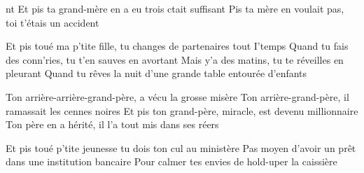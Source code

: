 nt
Et pis ta grand-mère en a eu trois ctait suffisant
Pis ta mère en voulait pas, toi t'étais un accident
\endverse

\beginverse
Et pis toué ma p'tite fille, tu changes de partenaires tout I'temps
Quand tu fais des conn'ries, tu t'en sauves en avortant
Mais y'a des matins, tu te réveilles en pleurant
Quand tu rêves la nuit d'une grande table entourée d'enfants
\endverse

\beginverse
Ton arrière-arrière-grand-père, a vécu la grosse misère
Ton arrière-grand-père, il ramassait les cennes noires
Et pis ton grand-père, miracle, est devenu millionnaire
Ton père en a hérité, il l'a tout mis dans ses réers
\endverse

\beginverse
Et pis toué p'tite jeunesse tu dois ton cul au ministère
Pas moyen d'avoir un prêt dans une institution bancaire
Pour calmer tes envies de hold-uper la caissière
\]\]\]\]\]\]\]\]\]\]\]\]\]\]\]\]\]\]\]\]\]\]\]\]\]\]\]\]\]\]\]\]\]\]\]\]\]\]\]\]\]\]\]\]\]\]\]\]\]\]\]\]\]\]\]\]\]\]\]\]\]\]\]\]\]\]\]\]\]\]\]\]\]\]\]\]\]\]\]\]\]\]\]\]\]\]\]\]\]\]\]\]\]\]\]\]\]\]\]\]\]\]\]\]\]\]\]\]\]\]\]\]\]\]\]\]\]\]\]\]\]\]\]\]\]\]\]\]\]\]\]\]\]\]\]\]\]\]\]\]\]\]\]\]\]\]\]\]\]\]\]\]\]\]\]\]\]\]\]\]\]\]\]\]\]\]\]\]\]\]\]\]\]\]\]\]\]\]\]\]\]\]\]\]\]\]\]\]\]\]\]\]\]\]\]\]\]\]\]\]\]\]\]\]\]\]\]\]\]\]\]\]\]\]\]\]\]\]\]\]\]\]\]\]\]\]\]\]\]\]\]\]\]\]\]\]\]\]\]\]\]\]\]\]\]\]\]\]\]\]\]\]\]\]\]\]\]\]\]\]\]\]\]\]\]\]\]\]\]\]\]\]\]\]\]\]\]\]\]\]\]\]\]\]\]\]\]\]\]\]\]\]\]\]\]\]\]\]\]\]\]\]\]\]\]\]\]\]\]\]\]\]\]\]\]\]\]\]\]\]\]\]\]\]\]\]\]\]\]\]\]\]\]\]\]\]\]\]\]\]\]\]\]\]\]\]\]\]\]\]\]\]\]\]\]\]\]\]\]\]\]\]\]\]\]\]\]\]\]\]\]\]\]\]\]\]\]\]\]\]\]\]\]\]\]\]\]\]\]\]\]\]\]\]\]\]\]\]\]\]\]\]\]\]\]\]\]\]\]\]\]\]\]\]\]\]\]\]\]\]\]\]\]\]\]\]\]\]\]\]\]\]\]\]\]\]\]\]\]\]\]\]\]\]\]\]\]\]\]\]\]\]\]\]\]\]\]\]\]\]\]\]\]\]\]\]\]\]\]\]\]\]\]\]\]\]\]\]\]\]\]\]\]\]\]\]\]\]\]\]\]\]\]\]\]\]\]\]\]\]\]\]\]\]\]\]\]\]\]\]\]\]\]\]\]\]\]\]\]\]\]\]\]\]\]\]\]\]\]\]\]\]\]\]\]\]\]\]\]\]\]\]\]\]\]\]\]\]\]\]\]\]\]\]\]\]\]\]\]\]\]\]\]\]\]\]\]\]\]\]\]\]\]\]\]\]\]\]\]\]\]\]\]\]\]\]\]\]\]\]\]\]\]\]\]\]\]\]\]\]\]\]\]\]\]\]\]\]\]\]\]\]\]\]\]\]\]\]\]\]\]\]\]\]\]\]\]\]\]\]\]\]\]\]\]\]\]\]\]\]\]\]\]\]\]\]\]\]\]\]\]\]\]\]\]\]\]\]\]\]\]\]\]\]\]\]\]\]\]\]\]\]\]\]\]\]\]\]\]\]\]\]\]\]\]\]\]\]\]\]\]\]\]\]\]\]\]\]\]\]\]\]\]\]\]\]\]\]\]\]\]\]\]\]\]\]\]\]\]\]\]\]\]\]\]\]\]\]\]\]\]\]\]\]\]\]\]\]\]\]\]\]\]\]\]\]\]\]\]\]\]\]\]\]\]\]\]\]\]\]\]\]\]\]\]\]\]\]\]\]\]\]\]\]\]\]\]\]\]\]\]\]\]\]\]\]\]\]\]\]\]\]\]\]\]\]\]\]\]\]\]\]\]\]\]\]\]\]\]\]\]\]\]\]\]\]\]\]\]\]\]\]\]\]\]\]\]\]\]\]\]\]\]\]\]\]\]\]\]\]\]\]\]\]\]\]\]\]\]\]\]\]\]\]\]\]\]\]\]\]\]\]\]\]\]\]\]\]\]\]\]\]\]\]\]\]\]\]\]\]\]\]\]\]\]\]\]\]\]\]\]\]\]\]\]\]\]\]\]\]\]\]\]\]\]\]\]\]\]\]\]\]\]\]\]\]\]\]\]\]\]\]\]\]\]\]\]\]\]\]\]\]\]\]\]\]\]\]\]\]\]\]\]\]\]\]\]\]\]\]\]\]\]\]\]\]\]\]\]\]\]\]\]\]\]\]\]\]\]\]\]\]\]\]\]\]\]\]\]\]\]\]\]\]\]\]\]\]\]\]\]\]\]\]\]\]\]\]\]\]\]\]\]\]\]\]\]\]\]\]\]\]\]\]\]\]\]\]\]\]\]\]\]\]\]\]\]\]\]\]\]\]\]\]\]\]\]\]\]\]\]\]\]\]\]\]\]\]\]\]\]\]\]\]\]\]\]\]\]\]\]\]\]\]\]\]\]\]\]\]\]\]\]\]\]\]\]\]\]\]\]\]\]\]\]\]\]\]\]\]\]\]\]\]\]\]\]\]\]\]\]\]\]\]\]\]\]\]\]\]\]\]\]\]\]\]\]\]\]\]\]\]\]\]\]\]\]\]\]\]\]\]\]\]\]\]\]\]\]\]\]\]\]\]\]\]\]\]\]\]\]\]\]\]\]\]\]\]\]\]\]\]\]\]\]\]\]\]\]\]\]\]\]\]\]\]\]\]\]\]\]\]\]\]\]\]\]\]\]\]\]\]\]\]\]\]\]\]\]\]\]\]\]\]\]\]\]\]\]\]\]\]\]\]\]\]\]\]\]\]\]
